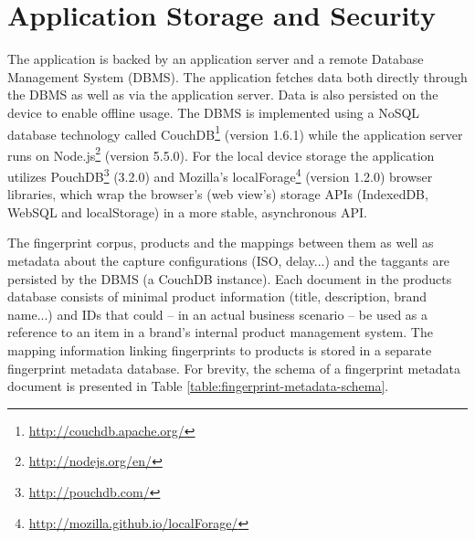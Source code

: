 \documentclass[thesis.tex]{subfiles}
\begin{document}
\section{Application Storage and Security}
\label{chapter:storage-security}

The application is backed by an application server and a remote Database Management System (DBMS). The application fetches data both directly through the DBMS as well as via the application server. Data is also persisted on the device to enable offline usage. The DBMS is implemented using a NoSQL database technology called CouchDB\footnote{\url{http://couchdb.apache.org/}} (version 1.6.1) while the application server runs on Node.js\footnote{\url{http://nodejs.org/en/}} (version 5.5.0). For the local device storage the application utilizes PouchDB\footnote{\url{http://pouchdb.com/}} (3.2.0) and Mozilla's localForage\footnote{\url{http://mozilla.github.io/localForage/}} (version 1.2.0) browser libraries, which wrap the browser's (web view's) storage APIs (IndexedDB, WebSQL and localStorage) in a more stable, asynchronous API.

The fingerprint corpus, products and the mappings between them as well as metadata about the capture configurations (ISO, delay...) and the taggants are persisted by the DBMS (a CouchDB instance). Each document in the products database consists of minimal product information (title, description, brand name...) and IDs that could -- in an actual business scenario -- be used as a reference to an item in a brand's internal product management system. The mapping information linking fingerprints to products is stored in a separate fingerprint metadata database. For brevity, the schema of a fingerprint metadata document is presented in Table \ref{table:fingerprint-metadata-schema}.
\end{document}
